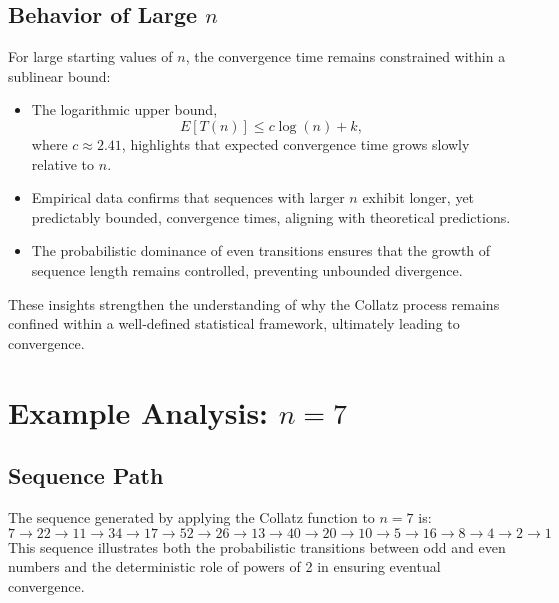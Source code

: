 \documentclass{article}
\begin{document}
\subsection{Behavior of Large $n$}
For large starting values of $n$, the convergence time remains constrained within a sublinear bound:
\begin{itemize}
    \item The logarithmic upper bound,
    \[
    E[T(n)] \leq c \log(n) + k,
    \]
    where $c \approx 2.41$, highlights that expected convergence time grows slowly relative to $n$.
    \item Empirical data confirms that sequences with larger $n$ exhibit longer, yet predictably bounded, convergence times, aligning with theoretical predictions.
    \item The probabilistic dominance of even transitions ensures that the growth of sequence length remains controlled, preventing unbounded divergence.
\end{itemize}
These insights strengthen the understanding of why the Collatz process remains confined within a well-defined statistical framework, ultimately leading to convergence.

\section{Example Analysis: $n = 7$}
\subsection{Sequence Path}
The sequence generated by applying the Collatz function to $n = 7$ is:
\[
7 \rightarrow 22 \rightarrow 11 \rightarrow 34 \rightarrow 17 \rightarrow 52 \rightarrow 26 \rightarrow 13 \rightarrow 40 \rightarrow 20 \rightarrow 10 \rightarrow 5 \rightarrow 16 \rightarrow 8 \rightarrow 4 \rightarrow 2 \rightarrow 1
\]
This sequence illustrates both the probabilistic transitions between odd and even numbers and the deterministic role of powers of 2 in ensuring eventual convergence.
\end{document}
